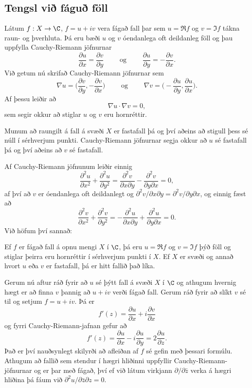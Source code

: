 \subsection*{Tengsl við fáguð föll}

Látum $f: X\to \C$, $f=u+iv$ vera fágað fall þar sem $u=\Re f$
og $v=\Im f$ tákna raun- og þverhluta.  Þá eru bæði $u$ og $v$
óendanlega oft deildanleg föll og þau uppfylla Cauchy-Riemann 
jöfnurnar
$$
\dfrac{\partial u}{\partial x}
=\dfrac{\partial v}{\partial y} \qquad \text{ og } \qquad
\dfrac{\partial u}{\partial y}
=-\dfrac{\partial v}{\partial x}.
$$
Við getum nú skrifað Cauchy-Riemann jöfnurnar sem
$$
\nabla u=\big(\dfrac{\partial v}{\partial y},-\dfrac{\partial
v}{\partial x}\big) \qquad \text{ og } \qquad
\nabla v=\big(-\dfrac{\partial u}{\partial y},\dfrac{\partial
u}{\partial x}\big). 
$$
Af þessu leiðir að 
$$
\nabla u\cdot \nabla v=0,
$$
sem segir okkur að stiglar $u$ og $v$ eru hornréttir.

Munum að raungilt á fall á svæði $X$ er fastafall þá og því aðeins að
stigull þess sé núll í sérhverjum punkti.  Cauchy-Riemann jöfnurnar
segja okkur að $u$ sé fastafall þá og því aðeins að $v$ sé fastafall.

Af Cauchy-Riemann jöfnunum leiðir einnig
$$
\dfrac {\partial^2 u}{\partial x^2}+  
\dfrac {\partial^2 u}{\partial y^2}
=\dfrac{\partial^2 v}{\partial x\partial y}  
-\dfrac{\partial^2 v}{\partial y\partial x}=0,  
$$
af því að $v$ er óendanlega oft deildanlegt og
$\partial^2 v/\partial x\partial y=\partial^2 v/\partial y\partial x$,
og einnig fæst að
$$
\dfrac {\partial^2 v}{\partial x^2}+  
\dfrac {\partial^2 v}{\partial y^2}
=-\dfrac{\partial^2 u}{\partial x\partial y}  
+\dfrac{\partial^2 u}{\partial y\partial x}=0.  
$$
Við höfum því sannað:

\begin{sex}  Ef $f$ er fágað fall á opnu mengi $X$ í $\C$, þá eru 
$u=\Re f$ og $v=\Im f$ þýð föll og stiglar þeirra eru hornréttir í
sérhverjum punkti í $X$.
Ef $X$ er svæði og annað hvort $u$ eða $v$ er fastafall, þá er hitt
fallið það líka.
\end{sex}


Gerum nú aftur ráð fyrir að $u$ sé þýtt fall á svæði $X$ í $\C$
og athugum hvernig hægt er að finna $v$ þannig að $u+iv$ verði fágað
fall.  Gerum ráð fyrir að slíkt $v$ sé til og setjum $f=u+iv$.  Þá
er 
$$
f'(z)=\dfrac{\partial u}{\partial x}+i\dfrac{\partial v}{\partial x}
$$
og fyrri Cauchy-Riemann-jafnan gefur að 
$$
f'(z)=\dfrac{\partial u}{\partial x}-i\dfrac{\partial u}{\partial y}
=2\dfrac{\partial u}{\partial z}.
$$ 
Það er því nauðsynlegt skilyrði að afleiðan af $f$ sé gefin með
þessari formúlu. Athugum að fallið sem stendur í hægri hliðinni
uppfyllir Cauchy-Riemann-jöfnurnar og er þar með fágað, 
því ef við látum virkjann
$\partial/\partial \bar z$ verka á hægri hliðina þá fáum við
$\partial^2u/\partial\bar z \partial z=0$.


